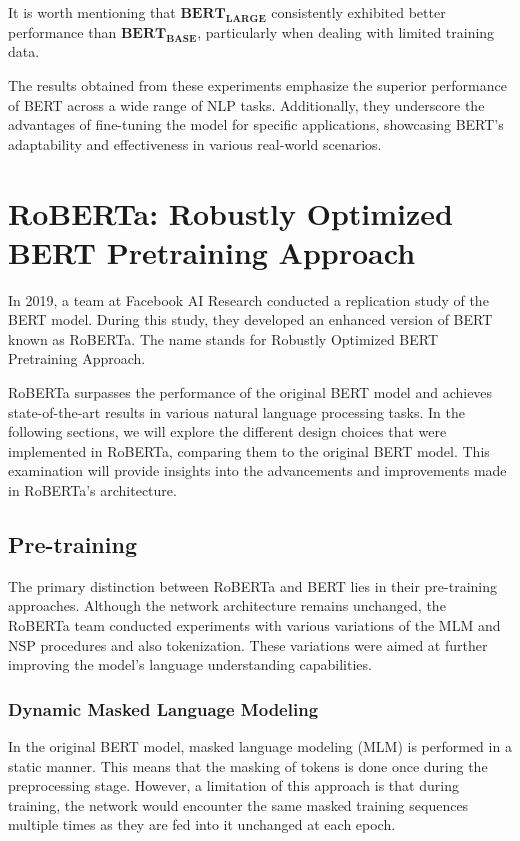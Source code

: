 \documentclass[a4paper,10pt]{report} %
\begin{document}
It is worth mentioning that $\mathbf{BERT_{LARGE}}$ consistently exhibited better performance than $\mathbf{BERT_{BASE}}$, particularly when dealing with limited training data.

The results obtained from these experiments emphasize the superior performance of BERT across a wide range of NLP tasks. Additionally, they underscore the advantages of fine-tuning the model for specific applications, showcasing BERT's adaptability and effectiveness in various real-world scenarios.

\section{RoBERTa: Robustly Optimized BERT Pretraining Approach}
In 2019, a team at Facebook AI Research conducted a replication study of the BERT model. During this study, they developed an enhanced version of BERT known as RoBERTa. The name stands for Robustly Optimized BERT Pretraining Approach.

RoBERTa surpasses the performance of the original BERT model and achieves state-of-the-art results in various natural language processing tasks. In the following sections, we will explore the different design choices that were implemented in RoBERTa, comparing them to the original BERT model. This examination will provide insights into the advancements and improvements made in RoBERTa's architecture.

\subsection{Pre-training}
The primary distinction between RoBERTa and BERT lies in their pre-training approaches. Although the network architecture remains unchanged, the RoBERTa team conducted experiments with various variations of the MLM and NSP procedures and also tokenization. These variations were aimed at further improving the model's language understanding capabilities.

\subsubsection{Dynamic Masked Language Modeling}
In the original BERT model, masked language modeling (MLM) is performed in a static manner. This means that the masking of tokens is done once during the preprocessing stage. However, a limitation of this approach is that during training, the network would encounter the same masked training sequences multiple times as they are fed into it unchanged at each epoch.
\end{document}
